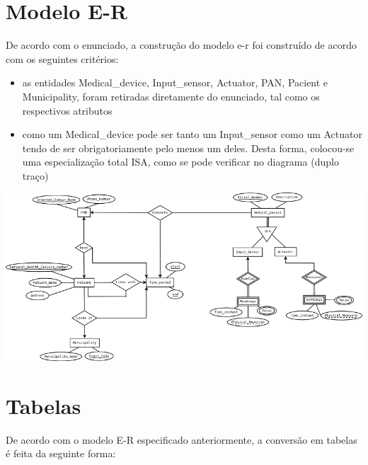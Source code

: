 \documentclass[a4paper]{article}
\begin{document}


\tableofcontents
{}
\pagebreak
{}
\section{Modelo E-R}
De acordo com o enunciado, a construção do modelo e-r foi construído de acordo com os seguintes critérios:

\begin{itemize}
	\item as entidades Medical\_device, Input\_sensor, Actuator, PAN, Pacient e Municipality, foram retiradas diretamente do enunciado, tal como os respectivos atributos
	
	\item como um Medical\_device pode ser tanto um Input\_sensor como um Actuator tendo de ser obrigatoriamente pelo menos um deles. Desta forma, colocou-se uma especialização total ISA, como se pode verificar no diagrama (duplo traço)  

	
\end{itemize}

\begin{landscape}
\includegraphics{Diagrama1.png}
\end{landscape}
\pagebreak

\section{Tabelas}
De acordo com o modelo E-R especificado anteriormente, a conversão em tabelas é feita da seguinte forma:
\end{document}
